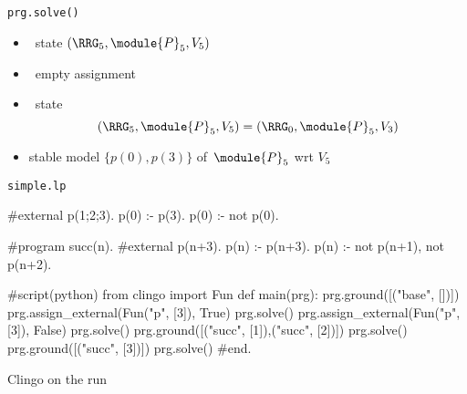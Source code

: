 \begin{frame}{\texttt{prg.solve()}}
  \begin{itemize}
  \item {} \clingo\ state $(\boldsymbol{\RRG}_5,\module{P}_5,V_5 )$
  \item {} \ empty assignment
    \medskip
  \item<2->  \clingo\ state
    \[
      (\boldsymbol{\RRG}_5,\module{P}_5,V_5 )
    = (\boldsymbol{\RRG}_0,\module{P}_5,V_3 )
    \]
  \item<3->  stable model $\{p(0),p(3)\}$ of~$\module{P}_5$ wrt $V_5$
  \end{itemize}
\end{frame}
\begin{frame}[fragile]{\texttt{simple.lp}}
\scriptsize\vspace{-10pt}%
\begin{semiverbatim}
   #external p(1;2;3).
   p(0) :- p(3).
   p(0) :- not p(0).

   #program succ(n).
   #external p(n+3).
   p(n) :- p(n+3).
   p(n) :- not p(n+1), not p(n+2).

   #script(python)
   from clingo import Fun
   def main(prg):
       prg.ground([("base", [])])
       prg.assign_external(Fun("p", [3]), True)
       prg.solve()
       prg.assign_external(Fun("p", [3]), False)
       prg.solve()
       prg.ground([("succ", [1]),("succ", [2])])
       prg.solve()
       prg.ground([("succ", [3])])
       prg.solve()
   #end.
\end{semiverbatim}
\end{frame}
\begin{frame}[fragile]{Clingo on the run}
\footnotesize
{}
\end{frame}

